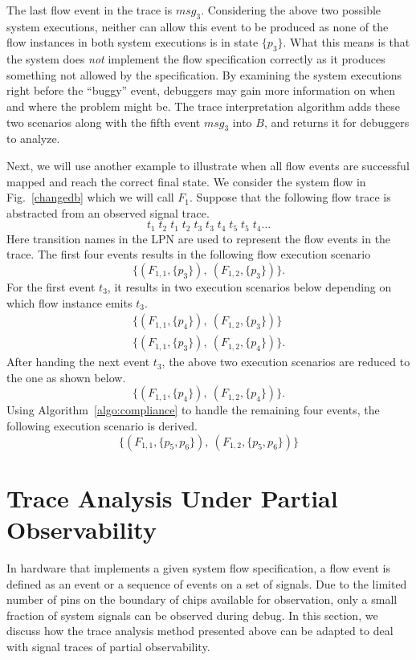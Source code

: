 \documentclass[12pt,frontmatter,copyright,thesis]{usfmanus}
\begin{document}
 The last flow event in the trace is $\mathit{msg}_3$.  Considering the above two possible system executions, neither can allow this event to be produced as none of the flow instances in both system executions is in state $\{p_3\}$.  What this means is that the system does {\em not} implement the flow specification correctly as it produces something not allowed by the specification.  By examining the system executions right before the ``buggy'' event, debuggers may gain more information on when and where the problem might be.  The trace interpretation algorithm adds these two scenarios along with the fifth event $\mathit{msg_3}$ into $B$, and returns it for debuggers to analyze.



Next, we will use another example to illustrate when all flow events are successful mapped and reach the correct final state.
We consider the system flow in
Fig.~\ref{changedb} which we will call $F_1$.
Suppose that the following flow trace is abstracted from an
observed signal trace.
\[
	t_1\;t_2\;t_1\;t_2\;t_3\;t_3\;t_4\;t_5\;t_5\;t_4\ldots
\]  
Here transition names in the LPN are used to represent the 
flow events in the trace.  The first four events results in
the following flow execution scenario
\[
	\{(F_{1,1}, \{p_3\}),~(F_{1,2}, \{p_3\})\}.
\]
For the first event $t_3$, it results in two execution scenarios 
below depending on which flow instance emits $t_3$.
\[
\begin{array}{l}
	\{(F_{1,1}, \{p_4\}),~(F_{1,2}, \{p_3\})\} \\
	\{(F_{1,1}, \{p_3\}),~(F_{1,2}, \{p_4\})\}.
\end{array}
\]
After handing the next event $t_3$, the above two execution scenarios
are reduced to the one as shown below.
\[
	\{(F_{1,1}, \{p_4\}),~(F_{1,2}, \{p_4\})\}.
\]
Using Algorithm~\ref{algo:compliance} to handle the
remaining four events, the following execution scenario is
derived.
\[
	\{(F_{1,1}, \{p_5, p_6\}),~(F_{1,2}, \{p_5, p_6\})\}
\]


\chapter{Trace Analysis Under Partial Observability}

In hardware that implements a given system flow
 specification, a flow event is defined as an event or a
 sequence of events on a set of signals.  Due to the limited
 number of pins on the boundary of chips available for
 observation, only a small fraction of system signals can be
 observed during debug.  In this section, we discuss how the
 trace analysis method presented above can be adapted to deal
 with signal traces of partial observability.
 
\end{document}
